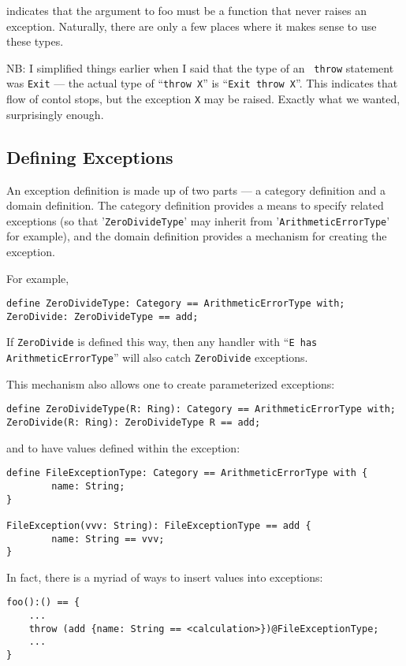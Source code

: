 \documentclass{article}
\begin{document}
indicates that the argument to foo must be a function that never
raises an exception.  Naturally, there are only a few places where it
makes sense to use these types.

NB: I simplified things earlier when I said that the type of an {\tt
throw} statement was {\tt Exit} --- the actual type of ``{\tt throw
X}'' is ``{\tt Exit throw X}''.
This indicates that flow of contol stops, but the exception {\tt X}
may be raised.  Exactly what we wanted, surprisingly enough.

\subsection{Defining Exceptions}

An exception definition is made up of two parts --- a category
definition and a domain definition.  The category definition provides
a means to specify related exceptions (so that '{\tt ZeroDivideType}' may
inherit from '{\tt ArithmeticErrorType}' for example), and the domain
definition provides a mechanism for creating the exception.

For example, 
\begin{verbatim}
define ZeroDivideType: Category == ArithmeticErrorType with;
ZeroDivide: ZeroDivideType == add;
\end{verbatim}

If {\tt ZeroDivide} is defined this way, then any handler with ``{\tt E
has Arith\-me\-tic\-ErrorType}'' will also catch {\tt ZeroDivide} exceptions.

This mechanism also allows one to create parameterized exceptions:
\begin{verbatim}
define ZeroDivideType(R: Ring): Category == ArithmeticErrorType with;
ZeroDivide(R: Ring): ZeroDivideType R == add;
\end{verbatim}

and to have values defined within the exception:
\begin{verbatim}
define FileExceptionType: Category == ArithmeticErrorType with {
        name: String;
}

FileException(vvv: String): FileExceptionType == add { 
        name: String == vvv;
}
\end{verbatim}

In fact, there is a myriad of ways to insert values into exceptions:
\begin{verbatim}
foo():() == {
    ...
    throw (add {name: String == <calculation>})@FileExceptionType;
    ...
}
\end{verbatim}
\end{document}
